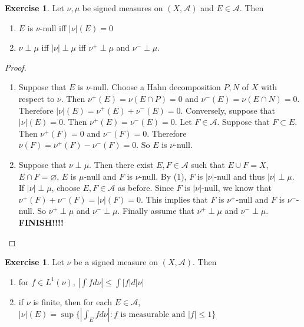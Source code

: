\documentclass[12pt]{amsart}
\theoremstyle{definition}
\newtheorem{ex}[definition]{Exercise}
\newcommand{\MA}{\mathcal{A}}
\newcommand{\lex}[1]{\label{ex:#1}}
\begin{document}
	\begin{ex} \lex{00000} 
		Let $\nu, \mu$ be signed measures on $(X,\MA)$ and $E \in \MA$. Then 
		\begin{enumerate}
			\item $E$ is $\nu$-null iff $|\nu|(E) = 0$
			\item $\nu \perp \mu$ iff $|\nu| \perp \mu$ iff $\nu^+ \perp \mu$ and $\nu^- \perp \mu$.
		\end{enumerate}
	\end{ex}
	
	\begin{proof}
		\begin{enumerate}
			\item Suppose that $E$ is $\nu$-null. Choose a Hahn decomposition $P,N$ of $X$ with respect to $\nu$. Then $\nu^+(E) = \nu(E \cap P) = 0$ and $\nu^-(E) = \nu(E \cap N) = 0$. Therefore $|\nu|(E) = \nu^+(E) + \nu^-(E) = 0$. Conversely, suppose that $|\nu|(E) = 0$. Then $\nu^+(E) = \nu^-(E) = 0$. Let $F \in \MA$. Suppose that $F \subset E$. Then $\nu^+(F) = 0$ and $\nu^-(F) = 0$. Therefore $\nu(F) = \nu^+(F) - \nu^-(F) = 0$. So $E$ is $\nu$-null.
			
			\item Suppose that $\nu \perp \mu$. Then there exist $E,F \in \MA$ such that $E \cup F = X$, $E \cap F = \varnothing$, $E$ is $\mu$-null and $F$ is $\nu$-null. By (1), $F$ is $|\nu|$-null and thus $|\nu| \perp \mu$. If $|\nu| \perp \mu$, choose $E,F \in \MA$ as before. Since $F$ is $|\nu|$-null, we know that $\nu^+(F) + \nu^-(F) = |\nu|(F) = 0$. This implies that $F$ is $\nu^+$-null and $F$ is $\nu^-$-null. So $\nu^+ \perp \mu$ and $\nu^- \perp \mu$. Finally assume that $\nu^+ \perp \mu$ and $\nu^- \perp \mu$. \textbf{FINISH!!!!}
			
		\end{enumerate}
	\end{proof}
	
	\begin{ex} \lex{00000} 
		Let $\nu$ be a signed measure on $(X, \MA)$. Then 
		\begin{enumerate}
			\item for $f \in L^1(\nu)$, $|\int f d \nu| \leq \int |f| d |\nu|$
			\item if $\nu$ is finite, then for each $E \in \MA$, $|\nu|(E) = \sup \{|\int_E f d \nu |: f  \text{ is measurable and } |f| \leq 1 \}$
		\end{enumerate}
	\end{ex}
	
\end{document}
